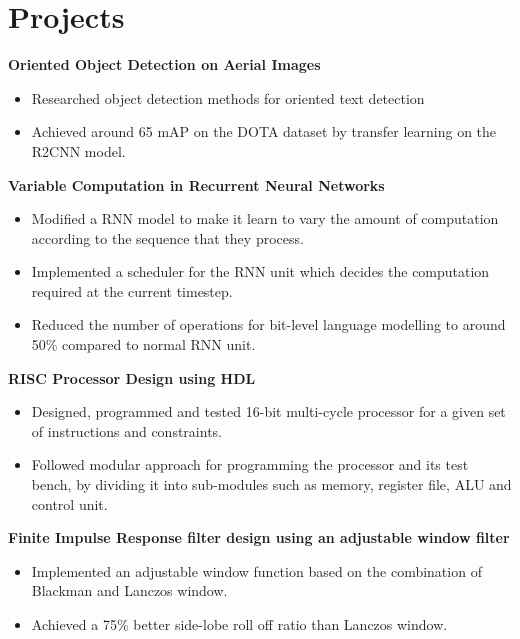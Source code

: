 \documentclass[a4paper]{article}
\newcommand{\resumeItem}[2]{
	\item\small{
		\textbf{#1}{ #2 \vspace{-5pt}}
	}
}
\newcommand{\resumeSubItem}[2]{\resumeItem{#1}{#2}\vspace{0pt}}
\newcommand{\resumeSubItemOneArg}[1]{\item \small #1\vspace{-1pt}}
\newcommand{\resumeSubHeadingListStart}{\begin{itemize}[leftmargin=*]}
\newcommand{\resumeSubHeadingListEnd}{\end{itemize}}
\newcommand{\resumeItemListStart}{\begin{itemize} \vspace*{-5pt}}
\newcommand{\resumeItemListEnd}{\end{itemize}}
\begin{document}
\section{Projects}
\resumeSubHeadingListStart
\resumeSubItem{Oriented Object Detection on Aerial Images}{
    \resumeItemListStart
     \resumeSubItemOneArg{Researched object detection methods for oriented text detection}
      \resumeSubItemOneArg{Achieved around 65 mAP on the DOTA dataset by transfer learning on the R2CNN model.}
       \resumeItemListEnd
}
\resumeSubItem{Variable Computation in Recurrent Neural Networks}{
    \resumeItemListStart
    \resumeSubItemOneArg{Modified a RNN model to make it learn to vary the amount of computation according to the sequence that they process.}
    \resumeSubItemOneArg{Implemented a scheduler for the RNN unit which decides the computation required at the current timestep.}
    \resumeSubItemOneArg{Reduced the number of operations for bit-level language modelling to around 50\% compared to normal RNN unit.}
    \resumeItemListEnd
    \vspace{-5pt}


\resumeSubItem{RISC Processor Design using HDL}{
\resumeItemListStart
    \resumeSubItemOneArg{Designed, programmed and tested 16-bit multi-cycle processor for a given set of instructions and constraints.}
    \resumeSubItemOneArg{Followed modular approach for programming the processor and its test bench, by dividing it into sub-modules such
as memory, register file, ALU and control unit. }
\resumeItemListEnd
}

\resumeSubItem{Finite Impulse Response filter design using an adjustable window filter}{
      \resumeItemListStart
      \resumeSubItemOneArg{Implemented an adjustable window function based on the combination of Blackman and Lanczos window.}
      \resumeSubItemOneArg{Achieved a 75\% better side-lobe roll off ratio than Lanczos window.}
      \resumeItemListEnd
    }
}

\resumeSubHeadingListEnd
\end{document}
